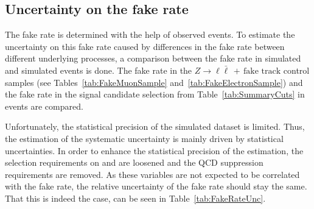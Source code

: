 \subsection{Uncertainty on the fake rate}
\label{sec:FakeRateUncertainty}
The fake rate \fakerate is determined with the help of observed \Zlep events.
To estimate the uncertainty on this fake rate caused by differences in the fake rate between different underlying processes, a comparison between the fake rate in simulated \ZlepJets and simulated \WJets events is done.
The fake rate in the $Z\rightarrow\ell \bar{\ell}\,+\,\text{fake track}$  control samples (see Tables~\ref{tab:FakeMuonSample} and~\ref{tab:FakeElectronSample}) 
and the fake rate in the signal candidate selection from Table~\ref{tab:SummaryCuts} in \WJets events are compared.

Unfortunately, the statistical precision of the simulated \WJets dataset is limited.
Thus, the estimation of the systematic uncertainty is mainly driven by statistical uncertainties.
In order to enhance the statistical precision of the estimation, the selection requirements on \met and \ptfirstjet are loosened and the QCD suppression requirements are removed.
As these variables are not expected to be correlated with the fake rate, the relative uncertainty of the fake rate should stay the same.
That this is indeed the case, can be seen in Table~\ref{tab:FakeRateUnc}.

\renewcommand{\arraystretch}{1.5}
\begin{table}[!h]
\centering
\caption{Fake rates in simulated \WJets and \ZlepJets events for different event-based selections of the \WJets sample. The track-based selection is the candidate track selection from Table~\ref{tab:SummaryCuts}.}
\label{tab:FakeRateUnc}
\end{table}

